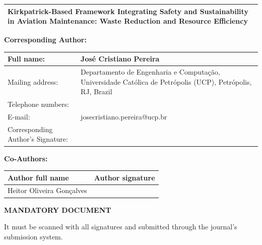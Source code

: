 \documentclass[12pt,a4paper]{article}
\newcommand{\sig}{\rule[-1.1cm]{0pt}{2.5cm}}
\begin{document}
\begin{tabularx}{\textwidth}{|X|}
\hline
\rule{0pt}{14pt}Kirkpatrick-Based Framework Integrating Safety and Sustainability in Aviation Maintenance: Waste Reduction and Resource Efficiency \\[4pt]
\hline
\end{tabularx}

\textbf{Corresponding Author:}

\begin{tabularx}{\textwidth}{|>{\raggedright\arraybackslash}p{4.6cm}|X|}
\hline
Full name: & José Cristiano Pereira \\
\hline
Mailing address: & Departamento de Engenharia e Computação, Universidade Católica de Petrópolis (UCP), Petrópolis, RJ, Brazil \\
\hline
Telephone numbers: & \\
\hline
E-mail: & josecristiano.pereira@ucp.br \\
\hline
Corresponding Author's Signature: & \sig \\
\hline
\end{tabularx}

\newpage

\textbf{Co-Authors:}

\begin{tabularx}{\textwidth}{|p{6cm}|X|}
\hline
\textbf{Author full name} & \textbf{Author signature} \\
\hline
Heitor Oliveira Gonçalves & \sig \\
\hline
\end{tabularx}

\vspace{1cm}
\begin{center}
\textbf{MANDATORY DOCUMENT}

It must be scanned with all signatures and submitted through the journal's submission system.
\end{center}
\end{document}
